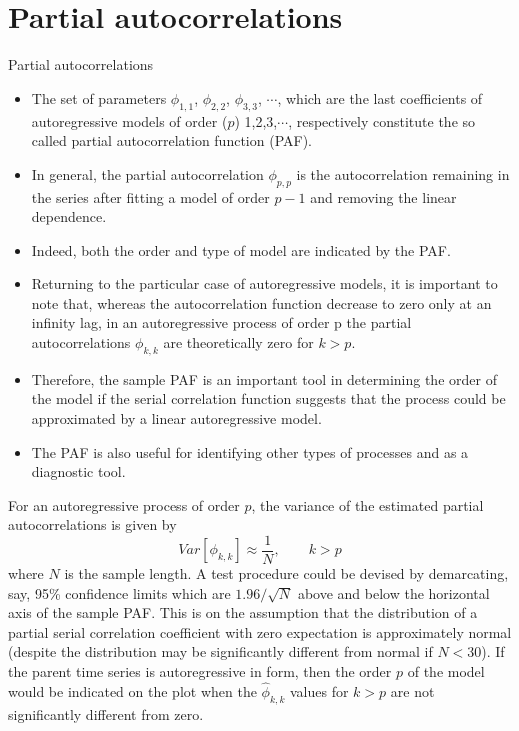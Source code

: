 \documentclass[8pt]{beamer}
\renewcommand{\emph}[1]{\textcolor{myorange}{#1}}
\begin{document}
\section{Partial autocorrelations}
\begin{frame}{Partial autocorrelations}
    \begin{itemize}
        \item The set of parameters $\phi_{1,1}$, $\phi_{2,2}$, $\phi_{3,3}$, $\cdots$, which are the \emph{last coefficients of autoregressive models} of order ($p$) 1,2,3,$\cdots$, respectively constitute the so called \alert{partial autocorrelation function (PAF)}.  
        \item In general, the \emph{partial autocorrelation $\phi_{p,p}$} is the autocorrelation remaining in the series after fitting a model of order $p-1$ and removing the linear dependence.
        \item Indeed, both the \emph{order} and \emph{type of model} are indicated by the \emph{PAF}. 
        \item Returning to the particular case of \emph{autoregressive models}, it is important to note that, whereas the \emph{autocorrelation function decrease} to zero only at an infinity lag, in an \emph{autoregressive process of order p} the \emph{partial autocorrelations} $\phi_{k,k}$ are theoretically zero for $k>p$. 
        \item Therefore, the sample \emph{PAF} is an important tool in determining the order of the model if the \emph{serial correlation function} suggests that the process could be approximated by a \emph{linear autoregressive model}. 
        \item The \emph{PAF} is also useful for \emph{identifying} other types of processes and as a \emph{diagnostic} tool.
    \end{itemize}
    For an \emph{autoregressive process} of order $p$, the variance of the estimated \emph{partial autocorrelations} is given by
    \[
        Var[\phi_{k,k}] \approx \frac{1}{N}, \quad \quad k>p
    \]
    where $N$ is the sample length. A test procedure could be devised by demarcating, say, 95\% \emph{confidence limits} which are $1.96/\sqrt{N}$ above and below the horizontal axis of the sample \emph{PAF}. This is on the assumption that the \emph{distribution} of a \emph{partial serial correlation coefficient} with zero expectation is approximately \emph{normal} (despite the distribution may be significantly different from \emph{normal} if $N<30$). If the parent \emph{time series}  is \emph{autoregressive} in form, then the order $p$ of the model would be indicated on the plot when the $\hat{\phi}_{k,k}$ values for $k>p$ are not significantly different from zero.

\end{frame}
\end{document}
